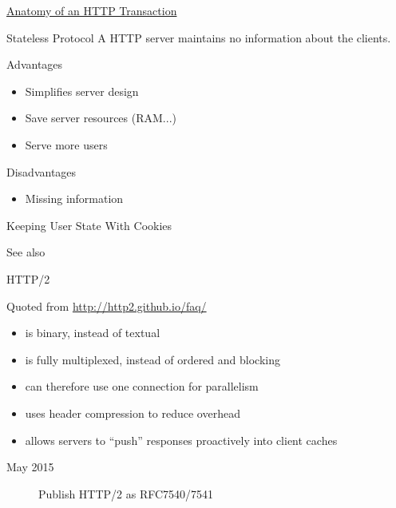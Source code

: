 \href{http://blog.catchpoint.com/2010/09/17/anatomyhttp/}{Anatomy of an HTTP Transaction}

\begin{frame}{Stateless Protocol}
  A HTTP server maintains no information about the clients.
  \begin{iblock}{Advantages}
    \begin{itemize}
    \item Simplifies server design
    \item Save server resources (RAM...)
    \item Serve more users
    \end{itemize}
  \end{iblock}
  \begin{iblock}{Disadvantages}
    \begin{itemize}
    \item Missing information
    \end{itemize}
  \end{iblock}
\end{frame}

\begin{frame}{Keeping User State With Cookies}
  \begin{center}
  \end{center}
\end{frame}

See also 

\begin{frame}{HTTP/2}
  \begin{iblock}{Quoted from \url{http://http2.github.io/faq/}}
    \begin{itemize}
    \item is binary, instead of textual
    \item is fully multiplexed, instead of ordered and blocking
    \item can therefore use one connection for parallelism
    \item uses header compression to reduce overhead
    \item allows servers to “push” responses proactively into client caches
    \end{itemize}
  \end{iblock}
  \begin{description}
  \item[May 2015] Publish HTTP/2 as RFC7540/7541
  \end{description}
\end{frame}

